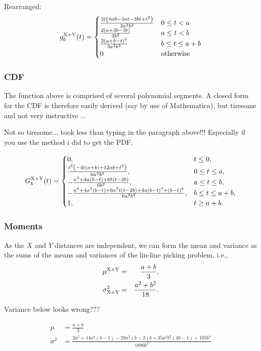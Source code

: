 Rearranged:
\begin{equation}
 g^{\rm X+Y}_b(t) =
 \begin{cases}
 \frac{2 t \left(6 a b-3 a t-3 b t+t^2\right)}{3 a^2 b^2}& 0 \le t < a \\
\frac{2 (a+3 b-3 t)}{3 b^2} & a \le t <  b \\
\frac{2 (a+b-t)^3}{3 a^2 b^2} & b \le t \le  a + b\\
 0 & \mbox{otherwise}
 \end{cases}
\end{equation}

\subsubsection{CDF}

The function above is comprised of several polynomial segments. A
closed form for the CDF is therefore easily derived (say by use of
Mathematica), but tiresome and not very instructive ...

Not so tiresome.., took less than typing in the paragraph above!!!
Especially if you use the method i did to get the PDF.

\begin{equation}
 G^{\rm X+Y}_b(t) =
 \begin{cases}
 0, & t \leq 0, \\
\frac{t^2 \left(-4 t (a+b)+12 a b+t^2\right)}{6 a^2 b^2}, & 0 \leq t \leq a, \\
-\frac{a^2+4 a (b-t)+6 t (t-2 b)}{6 b^2}, & a \leq t \leq  b, \\
-\frac{a^4+4 a^3 (b-t)+6 a^2 t (t-2 b)+4 a (b-t)^3+(b-t)^4}{6 a^2 b^2}, & b \leq t  \leq  a + b,\\
 1, & t \geq a + b.
 \end{cases}
\end{equation}


\subsubsection{Moments}

As the $X$ and $Y$ distances are independent, we can form the mean and
variance as the sums of the means and variances of the lin-line
picking problem, i.e.,
\begin{eqnarray}
  \mu^{\rm X+Y} & = & \frac{a+b}{3}, \\
  \label{eq:rect_man_mean}
  \sigma^2_{\rm X+Y}
      & = & \frac{a^{2} + b^2}{18}.
  \label{eq:rect_man_var}
\end{eqnarray}



Variance below looks wrong???

\begin{eqnarray}
 \mu & = \frac{a+b}{3} \\
 \sigma^{2} & = \frac{2 a^5+14 a^4 (b-1)-28 a^3 (b-2) b+35 a^2 b^2 (4 b-1)+105 b^4}{1890 b^2}
\end{eqnarray}






